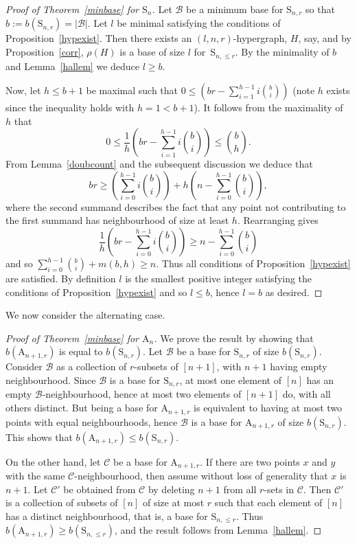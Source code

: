 \documentclass[10pt,a4paper]{amsart}
\renewcommand\S{\mathrm{S}}
\theoremstyle{plain}
\theoremstyle{definition}
\theoremstyle{remark}
\begin{document}
\begin{proof}[Proof of Theorem~\ref{minbase} for $\S_n$]
Let $\mathcal{B}$ be a minimum base for $\S_{n,r}$ so that $b:=b(\S_{n,r})=|\mathcal{B}|$. Let $l$ be minimal satisfying the conditions of Proposition~\ref{hypexist}. Then there exists an $(l,n,r)$-hypergraph, $H$, say, and by Proposition~\ref{corr}, $\rho(H)$ is a base of size $l$ for~$\S_{n,\leq r}$. By the minimality of $b$ and Lemma~\ref{hallem} we deduce $l\geq b$. 

Now, let $h\leq b+1$ be maximal such that $0\leq\left(br-\sum_{i=1}^{h-1}i\binom{b}{i}\right)$ (note $h$ exists since the inequality holds with $h=1<b+1$). It follows from the maximality of $h$ that $$0\leq\frac{1}{h}\left(br-\sum_{i=1}^{h-1}i\binom{b}{i}\right)\leq\binom{b}{h}.$$ From Lemma~\ref{doubcount} and the subsequent discussion we deduce that $$br\geq\left(\sum_{i=0}^{h-1}i\binom{b}{i}\right)+h\left(n-\sum_{i=0}^{h-1}\binom{b}{i}\right),$$ where the second summand describes the fact that any point not contributing to the first summand has neighbourhood of size at least $h$. Rearranging gives $$\frac{1}{h}\left(br-\sum_{i=0}^{h-1}i\binom{b}{i}\right)\geq n-\sum_{i=0}^{h-1}\binom{b}{i}$$ and so $\sum_{i=0}^{h-1}\binom{b}{i}+m(b,h)\geq n$. Thus all conditions of Proposition~\ref{hypexist} are satisfied. By definition $l$ is the smallest positive integer satisfying the conditions of Proposition~\ref{hypexist} and so $l\leq b$, hence $l=b$ as desired.
\end{proof}

We now consider the alternating case.

\begin{proof}[Proof of Theorem~\ref{minbase} for $\mathrm{A}_n$]
We prove the result by showing that $b(\mathrm{A}_{n+1,r})$ is equal to $b(\mathrm{S}_{n,r}).$ Let $\mathcal{B}$ be a base for $\S_{n,r}$ of size $b(\S_{n,r})$. Consider $\mathcal{B}$ as a collection of $r$-subsets of $[n+1]$, with $n+1$ having empty neighbourhood. Since $\mathcal{B}$ is a base for $\S_{n,r}$, at most one element of $[n]$ has an empty $\mathcal{B}$-neighbourhood, hence at most two elements of $[n+1]$ do, with all others distinct. But being a base for $\mathrm{A}_{n+1,r}$ is equivalent to having at most two points with equal neighbourhoods, hence $\mathcal{B}$ is a base for $\mathrm{A}_{n+1,r}$ of size $b(\S_{n,r})$. This shows that $b(\mathrm{A}_{n+1,r})\leq b(\S_{n,r})$.

On the other hand, let $\mathcal{C}$ be a base for $\mathrm{A}_{n+1,r}$. If there are two points $x$ and $y$ with the same $\mathcal{C}$-neighbourhood, then assume without loss of generality that $x$ is $n+1$. Let $\mathcal{C}'$ be obtained from $\mathcal{C}$ by deleting $n+1$ from all $r$-sets in $\mathcal{C}$. Then $\mathcal{C}'$ is a collection of subsets of $[n]$ of size at most $r$ such that each element of $[n]$ has a distinct neighbourhood, that is, a base for $\S_{n,\leq r}$. Thus $b(\mathrm{A}_{n+1,r})\geq b(\S_{n,\leq r})$, and the result follows from Lemma~\ref{hallem}.
\end{proof}
\end{document}
